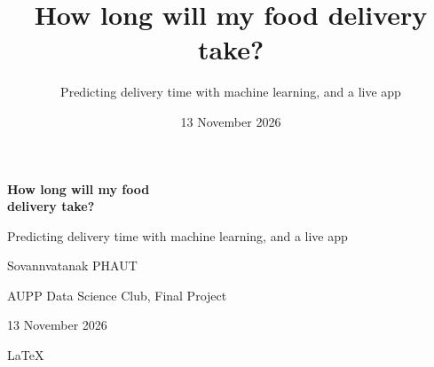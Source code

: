 \documentclass[aspectratio=169,12pt]{beamer}
\title{How long will my food delivery take?}
\subtitle{Predicting delivery time with machine learning, and a live app}
\author{\presenter}
\institute{AUPP Data Science Club \textbullet\ Final Project}
\date{13 November 2026}
\newcommand{\presenter}{Sovannvatanak PHAUT}
\begin{document}
\begin{frame}[plain,label=title]
  \vspace{0.5cm}
  \hspace{0.6cm}\begin{minipage}{0.85\textwidth}\raggedright
    {\fontsize{30}{34}\selectfont\bfseries\color{ink}How long will my food\\delivery take?\par}
    \vspace{0.3cm}
    {\Large\color{teal}Predicting delivery time with machine learning, and a live app\par}
    \vspace{0.3cm}
    \begin{center}
    {\large\presenter\par}
    {\color{grey}AUPP Data Science Club, Final Project\par}
    {\color{grey}13 November 2026\par}
    {\color{grey}\LaTeX\par}
    \end{center}
    \vspace{0.1cm}
    \hyperlink{s-problem}{}
  \end{minipage}
\end{frame}

\end{document}
